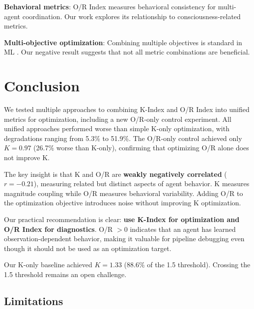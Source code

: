 \documentclass[twoside]{article}
\theoremstyle{remark}
\begin{document}
\textbf{Behavioral metrics}: O/R Index \citep{or2025} measures behavioral
consistency for multi-agent coordination. Our work explores its relationship
to consciousness-related metrics.

\textbf{Multi-objective optimization}: Combining multiple objectives is
standard in ML \citep{deb2002}. Our negative result suggests that not all
metric combinations are beneficial.

\section{Conclusion}

We tested multiple approaches to combining K-Index and O/R Index into unified
metrics for optimization, including a new O/R-only control experiment. All unified
approaches performed worse than simple K-only optimization, with degradations
ranging from 5.3\% to 51.9\%. The O/R-only control achieved only $K = 0.97$ (26.7\%
worse than K-only), confirming that optimizing O/R alone does not improve K.

The key insight is that K and O/R are \textbf{weakly negatively correlated}
($r = -0.21$), measuring related but distinct aspects of agent behavior.
K measures magnitude coupling while O/R measures behavioral variability.
Adding O/R to the optimization objective introduces noise without improving
K optimization.

Our practical recommendation is clear: \textbf{use K-Index for optimization
and O/R Index for diagnostics}. O/R $> 0$ indicates that an agent has learned
observation-dependent behavior, making it valuable for pipeline debugging even
though it should not be used as an optimization target.

Our K-only baseline achieved $K = 1.33$ (88.6\% of the 1.5 threshold).
Crossing the 1.5 threshold remains an open challenge.

\subsection{Limitations}
\end{document}

